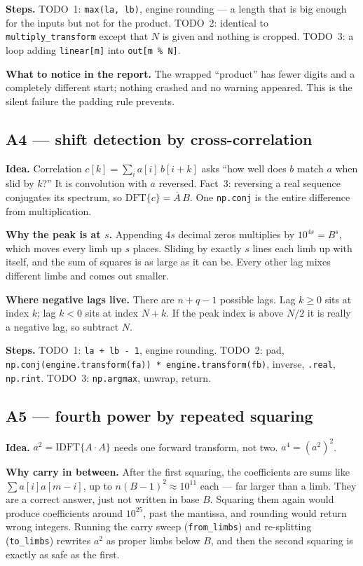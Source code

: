 \documentclass[11pt]{article}
\newcommand{\code}[1]{\texttt{#1}}
\begin{document}
\textbf{Steps.} TODO~1: \code{max(la, lb)}, engine rounding --- a length that
is big enough for the inputs but not for the product. TODO~2: identical to
\code{multiply\_transform} except that $N$ is given and nothing is cropped.
TODO~3: a loop adding \code{linear[m]} into \code{out[m \% N]}.

\textbf{What to notice in the report.} The wrapped ``product'' has fewer digits
and a completely different start; nothing crashed and no warning appeared. This
is the silent failure the padding rule prevents.

\subsection*{A4 --- shift detection by cross-correlation}

\textbf{Idea.} Correlation $c[k] = \sum_i a[i]\,b[i+k]$ asks ``how well does
$b$ match $a$ when slid by $k$?'' It is convolution with $a$ reversed. Fact~3:
reversing a real sequence conjugates its spectrum, so
$\mathrm{DFT}\{c\} = \overline{A}\,B$. One \code{np.conj} is the entire
difference from multiplication.

\textbf{Why the peak is at $s$.} Appending $4s$ decimal zeros multiplies by
$10^{4s} = B^{s}$, which moves every limb up $s$ places. Sliding by exactly $s$
lines each limb up with itself, and the sum of squares is as large as it can
be. Every other lag mixes different limbs and comes out smaller.

\textbf{Where negative lags live.} There are $n + q - 1$ possible lags. Lag
$k \ge 0$ sits at index $k$; lag $k < 0$ sits at index $N + k$. If the peak
index is above $N/2$ it is really a negative lag, so subtract $N$.

\textbf{Steps.} TODO~1: \code{la + lb - 1}, engine rounding. TODO~2: pad,
\code{np.conj(engine.transform(fa)) * engine.transform(fb)}, inverse,
\code{.real}, \code{np.rint}. TODO~3: \code{np.argmax}, unwrap, return.

\subsection*{A5 --- fourth power by repeated squaring}

\textbf{Idea.} $a^2 = \mathrm{IDFT}\{A \cdot A\}$ needs one forward transform,
not two. $a^4 = (a^2)^2$.

\textbf{Why carry in between.} After the first squaring, the coefficients are
sums like $\sum a[i] a[m-i]$, up to $n (B-1)^2 \approx 10^{11}$ each --- far
larger than a limb. They are a correct answer, just not written in base $B$.
Squaring them again would produce coefficients around $10^{25}$, past the
mantissa, and rounding would return wrong integers. Running the carry sweep
(\code{from\_limbs}) and re-splitting (\code{to\_limbs}) rewrites $a^2$ as
proper limbs below $B$, and then the second squaring is exactly as safe as the
first.
\end{document}
